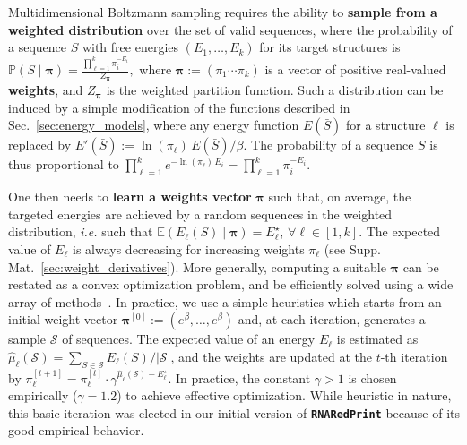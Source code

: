 \documentclass{bioinfo}
\newcommand{\val}{\bar S} %
\newcommand{\partfun}[1]{Z_{#1}}
\newcommand{\Def}[1]{{\bfseries #1}}
\newcommand{\TargetE}{E^{\star}}
\newcommand{\ourprog}{{\tt \bfseries{}\color{black!85}RNA\textcolor{red!70!black}{Red}Print}}
\begin{document}
Multidimensional Boltzmann sampling requires the ability to \Def{sample from a weighted distribution} over the set of valid sequences, where the probability of a sequence $S$ with free energies $(E_1,\ldots,E_k)$ for its target structures is
$\mathbb{P}(S\mid \pmb{\pi}) = \frac{\prod_{\ell=1}^{k} \pi_i^{-E_i}}{\partfun{\pmb{\pi}}},$
where $\pmb{\pi}:=(\pi_1\cdots\pi_k)$ is a vector of positive real-valued \Def{weights}, and $\partfun{\pmb{\pi}}$ is the weighted partition function. Such a distribution can be induced by a simple modification of the functions described in Sec.~\ref{sec:energy_models}, where any energy function $E(\val)$ for a structure $\ell$ is replaced by $E'(\val):= \ln(\pi_\ell)\, E(\val)/\beta$. The probability of a sequence $S$ is thus proportional to
$ \prod_{\ell=1}^{k} e^{-\ln(\pi_\ell)\, E_i} = \prod_{\ell=1}^{k} \pi_i^{-E_i}. $

One then needs to \Def{learn a weights vector} $\pmb{\pi}$ such that, on average, the targeted energies are achieved by a random sequences in the weighted distribution, \emph{i.e.} such that  $\mathbb{E}(E_\ell(S)\mid \pmb{\pi})=\TargetE_\ell$,  $\forall\ell\in[1,k]$.
The expected value of $E_\ell$ is always decreasing for increasing weights $\pi_\ell$ (see Supp. Mat.~\ref{sec:weight_derivatives}). More generally, computing a suitable $\pmb{\pi}$ can be restated as a convex optimization problem, and be efficiently solved using a wide array of methods~\citep{Denise2010,Bendkowski2017}.
In practice, we use a simple heuristics which starts from an initial weight vector $\pmb{\pi}^{[0]}:=(e^\beta,\dots,e^\beta)$ and, at each iteration, generates a sample $\mathcal{S}$ of sequences. The expected value of an energy $E_\ell$ is estimated as $\hat\mu_\ell(\mathcal{S}) = \sum_{S\in\mathcal{S}}E_\ell(S)/|\mathcal{S}|$, and the weights are updated at the $t$-th iteration by %
$\pi_\ell^{[t+1]} = \pi_\ell^{[t]}\cdot \gamma^{\hat\mu_\ell(\mathcal{S})-\TargetE_\ell}$. In practice, the constant $\gamma>1$ is chosen empirically  ($\gamma=1.2$) to achieve effective optimization.
While heuristic in nature, this basic iteration was elected in our initial version of \ourprog{} because of its good empirical behavior.
\end{document}
